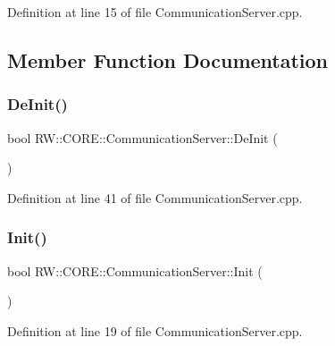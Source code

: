 Definition at line 15 of file Communication\+Server.\+cpp.



\subsection{Member Function Documentation}
\hypertarget{class_r_w_1_1_c_o_r_e_1_1_communication_server_ac7b0fd62b6071c494f132e1a9e312604}{}\label{class_r_w_1_1_c_o_r_e_1_1_communication_server_ac7b0fd62b6071c494f132e1a9e312604} 
\subsubsection{\texorpdfstring{De\+Init()}{DeInit()}}
{\footnotesize\ttfamily bool R\+W\+::\+C\+O\+R\+E\+::\+Communication\+Server\+::\+De\+Init (\begin{DoxyParamCaption}{ }\end{DoxyParamCaption})}



Definition at line 41 of file Communication\+Server.\+cpp.

\hypertarget{class_r_w_1_1_c_o_r_e_1_1_communication_server_a202a8635256a2ce503019a664917b095}{}\label{class_r_w_1_1_c_o_r_e_1_1_communication_server_a202a8635256a2ce503019a664917b095} 
\subsubsection{\texorpdfstring{Init()}{Init()}}
{\footnotesize\ttfamily bool R\+W\+::\+C\+O\+R\+E\+::\+Communication\+Server\+::\+Init (\begin{DoxyParamCaption}{ }\end{DoxyParamCaption})}



Definition at line 19 of file Communication\+Server.\+cpp.

\hypertarget{class_r_w_1_1_c_o_r_e_1_1_communication_server_a44354b19e6c0aad3f462904978b671a3}{}\label{class_r_w_1_1_c_o_r_e_1_1_communication_server_a44354b19e6c0aad3f462904978b671a3} 
